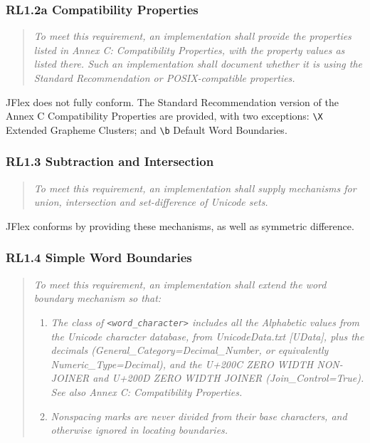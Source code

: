 \subsubsection{RL1.2a Compatibility
Properties}\label{rl1.2a-compatibility-properties}

\begin{quote}
\emph{To meet this requirement, an implementation shall provide the
properties listed in Annex C: Compatibility Properties, with the
property values as listed there. Such an implementation shall document
whether it is using the Standard Recommendation or POSIX-compatible
properties.}
\end{quote}

JFlex does not fully conform. The Standard Recommendation version of the
Annex C Compatibility Properties are provided, with two exceptions:
\texttt{\textbackslash{}X} Extended Grapheme Clusters; and
\texttt{\textbackslash{}b} Default Word Boundaries.

\subsubsection{RL1.3 Subtraction and
Intersection}\label{rl1.3-subtraction-and-intersection}

\begin{quote}
\emph{To meet this requirement, an implementation shall supply
mechanisms for union, intersection and set-difference of Unicode sets.}
\end{quote}

JFlex conforms by providing these mechanisms, as well as symmetric
difference.

\subsubsection{RL1.4 Simple Word
Boundaries}\label{rl1.4-simple-word-boundaries}

\begin{quote}
\emph{To meet this requirement, an implementation shall extend the word
boundary mechanism so that:}

\begin{enumerate}
\def\labelenumi{\arabic{enumi}.}
\item
  \emph{The class of \texttt{\textless{}word\_character\textgreater{}}
  includes all the Alphabetic values from the Unicode character
  database, from UnicodeData.txt {[}UData{]}, plus the decimals
  (General\_Category=Decimal\_Number, or equivalently
  Numeric\_Type=Decimal), and the U+200C ZERO WIDTH NON-JOINER and
  U+200D ZERO WIDTH JOINER (Join\_Control=True). See also Annex C:
  Compatibility Properties.}
\item
  \emph{Nonspacing marks are never divided from their base characters,
  and otherwise ignored in locating boundaries.}
\end{enumerate}
\end{quote}

